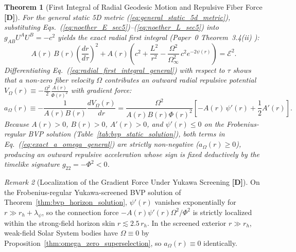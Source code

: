 \documentclass[11pt,a4paper]{article}
\newcommand{\catD}{\textbf{\textcolor{blue!75!black}{[D]}}}
\newtheorem{theorem}{Theorem}[section]
\theoremstyle{definition}
\theoremstyle{remark}
\newtheorem{remark}[theorem]{Remark}
\begin{document}
\begin{theorem}[First Integral of Radial Geodesic Motion and Repulsive Fiber Force \catD]
\label{thm:horizon_regularity}
For the general static 5D metric (\ref{eq:general_static_5d_metric}), substituting Eqs.~(\ref{eq:noether_E_sec5})--(\ref{eq:noether_L_sec5}) into $g_{AB}U^A U^B = -c^2$ yields the exact radial first integral (Paper~0 Theorem~3.4(ii) \cite{JV_Paper0}):
\begin{equation}
  A(r)\,B(r)\left(\frac{dr}{d\tau}\right)^2 + A(r)\left(c^2 + \frac{L^2}{r^2} - \frac{\Omega^2}{\Omega_{\infty}^2}\,c^2 e^{-2\psi(r)}\right) = \mathcal{E}^2.
  \label{eq:radial_first_integral_general}
\end{equation}
Differentiating Eq.~(\ref{eq:radial_first_integral_general}) with respect to $\tau$ shows that a non-zero fiber velocity $\Omega$ contributes an outward radial repulsive potential $V_{\Omega}(r) \equiv -\frac{\Omega^2}{2}\frac{A(r)}{\Phi(r)^2}$ with gradient force:
\begin{equation}
  a_{\Omega}(r) \equiv -\frac{1}{A(r)B(r)}\frac{dV_{\Omega}(r)}{dr} = \frac{\Omega^2}{A(r)B(r)\Phi(r)^2}\left[-A(r)\,\psi'(r) + \frac{1}{2}A'(r)\right].
  \label{eq:exact_a_omega_general}
\end{equation}
Because $A(r) > 0$, $B(r) > 0$, $A'(r) > 0$, and $\psi'(r) \le 0$ on the Frobenius-regular BVP solution (Table~\ref{tab:bvp_static_solution}), both terms in Eq.~(\ref{eq:exact_a_omega_general}) are strictly non-negative ($a_{\Omega}(r) \ge 0$), producing an outward repulsive acceleration whose sign is fixed deductively by the timelike signature $g_{22} = -\Phi^2 < 0$.
\end{theorem}

\begin{remark}[Localization of the Gradient Force Under Yukawa Screening \catD]
\label{rem:force_localization}
On the Frobenius-regular Yukawa-screened BVP solution of Theorem~\ref{thm:bvp_horizon_solution}, $\psi'(r)$ vanishes exponentially for $r \gg r_h + \lambda_{\psi}$, so the connection force $-A(r)\psi'(r)\Omega^2/\Phi^2$ is strictly localized within the strong-field horizon skin $r \lesssim 2.5\,r_h$. In the screened exterior $r \gg r_h$, weak-field Solar System bodies have $\Omega \equiv 0$ by Proposition~\ref{thm:omega_zero_superselection}, so $a_{\Omega}(r) \equiv 0$ identically.
\end{remark}

\end{document}
